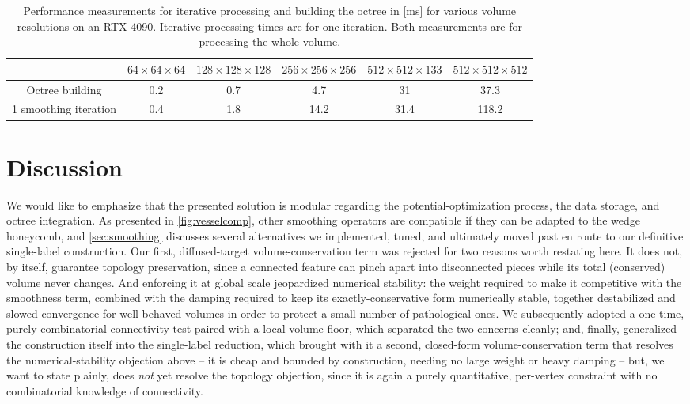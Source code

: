 \documentclass[journal]{vgtc}                     %
\begin{document}
\begin{table}[t!]
	\caption{Performance measurements for iterative processing and building the octree in [ms] for various volume resolutions on an RTX 4090. Iterative processing times are for one iteration. Both measurements are for processing the whole volume.}
	\label{tab:performance8nv}
	\centering
	\begin{tabular}{cccccc} \toprule
		& $64 \times 64 \times 64$ & $128 \times 128 \times 128$ & $256 \times 256 \times 256$ & $512 \times 512 \times 133$ & $512 \times 512 \times 512$ \\
		\midrule
		Octree building & 0.2 & 0.7 & 4.7  & 31 & 37.3 \\
		\midrule
		1 smoothing iteration     & 0.4 & 1.8 & 14.2 & 31.4 & 118.2 \\
		\bottomrule
	\end{tabular}
\end{table}


\section{Discussion} \label{sec:discussion}

We would like to emphasize that the presented solution is modular regarding the potential-optimization process, the data storage, and octree integration. As presented in \cref{fig:vesselcomp}, other smoothing operators are compatible if they can be adapted to the wedge honeycomb, and \cref{sec:smoothing} discusses several alternatives we implemented, tuned, and ultimately moved past en route to our definitive single-label construction. Our first, diffused-target volume-conservation term was rejected for two reasons worth restating here. It does not, by itself, guarantee topology preservation, since a connected feature can pinch apart into disconnected pieces while its total (conserved) volume never changes. And enforcing it at global scale jeopardized numerical stability: the weight required to make it competitive with the smoothness term, combined with the damping required to keep its exactly-conservative form numerically stable, together destabilized and slowed convergence for well-behaved volumes in order to protect a small number of pathological ones. We subsequently adopted a one-time, purely combinatorial connectivity test paired with a local volume floor, which separated the two concerns cleanly; and, finally, generalized the construction itself into the single-label reduction, which brought with it a second, closed-form volume-conservation term that resolves the numerical-stability objection above -- it is cheap and bounded by construction, needing no large weight or heavy damping -- but, we want to state plainly, does \emph{not} yet resolve the topology objection, since it is again a purely quantitative, per-vertex constraint with no combinatorial knowledge of connectivity.
\end{document}

